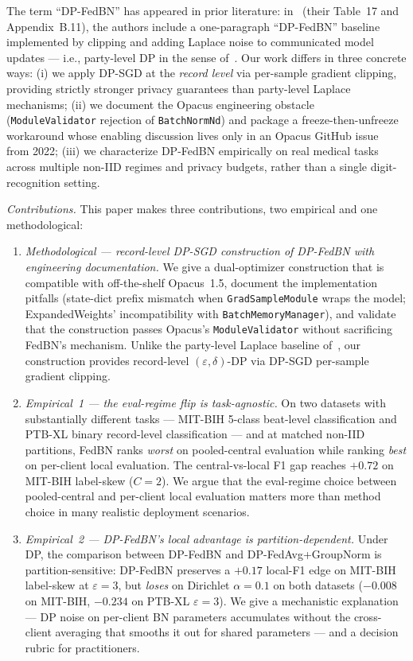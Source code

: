 \documentclass[conference]{IEEEtran}
\newcommand{\code}[1]{\texttt{\small #1}}
\begin{document}
The term ``DP-FedBN'' has appeared in prior literature: in~\cite{adcol} (their Table~17 and Appendix~B.11), the authors include a one-paragraph ``DP-FedBN'' baseline implemented by clipping and adding Laplace noise to communicated model updates --- i.e., party-level DP in the sense of~\cite{geyer}. Our work differs in three concrete ways: (i) we apply DP-SGD at the \emph{record level} via per-sample gradient clipping, providing strictly stronger privacy guarantees than party-level Laplace mechanisms; (ii) we document the Opacus engineering obstacle (\code{ModuleValidator} rejection of \code{BatchNormNd}) and package a freeze-then-unfreeze workaround whose enabling discussion lives only in an Opacus GitHub issue~\cite{opacusissue} from 2022; (iii) we characterize DP-FedBN empirically on real medical tasks across multiple non-IID regimes and privacy budgets, rather than a single digit-recognition setting.

\emph{Contributions.} This paper makes three contributions, two empirical and one methodological:
\begin{enumerate}
\item \emph{Methodological --- record-level DP-SGD construction of DP-FedBN with engineering documentation.} We give a dual-optimizer construction that is compatible with off-the-shelf Opacus~1.5, document the implementation pitfalls (state-dict prefix mismatch when \code{GradSampleModule} wraps the model; ExpandedWeights' incompatibility with \code{BatchMemoryManager}), and validate that the construction passes Opacus's \code{ModuleValidator} without sacrificing FedBN's mechanism. Unlike the party-level Laplace baseline of~\cite{adcol}, our construction provides record-level $(\varepsilon,\delta)$-DP via DP-SGD per-sample gradient clipping.
\item \emph{Empirical~1 --- the eval-regime flip is task-agnostic.} On two datasets with substantially different tasks --- MIT-BIH 5-class beat-level classification and PTB-XL binary record-level classification --- and at matched non-IID partitions, FedBN ranks \emph{worst} on pooled-central evaluation while ranking \emph{best} on per-client local evaluation. The central-vs-local F1 gap reaches $+0.72$ on MIT-BIH label-skew ($C{=}2$). We argue that the eval-regime choice between pooled-central and per-client local evaluation matters more than method choice in many realistic deployment scenarios.
\item \emph{Empirical~2 --- DP-FedBN's local advantage is partition-dependent.} Under DP, the comparison between DP-FedBN and DP-FedAvg+GroupNorm is partition-sensitive: DP-FedBN preserves a $+0.17$ local-F1 edge on MIT-BIH label-skew at $\varepsilon{=}3$, but \emph{loses} on Dirichlet $\alpha{=}0.1$ on both datasets ($-0.008$ on MIT-BIH, $-0.234$ on PTB-XL $\varepsilon{=}3$). We give a mechanistic explanation --- DP noise on per-client BN parameters accumulates without the cross-client averaging that smooths it out for shared parameters --- and a decision rubric for practitioners.
\end{enumerate}
\end{document}
